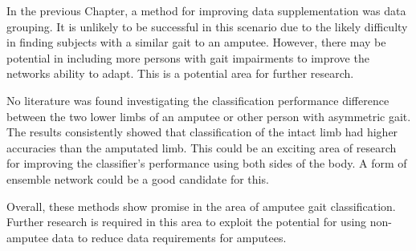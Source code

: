 In the previous Chapter, a method for improving data supplementation was data grouping. It is unlikely to be successful in this scenario due to the likely difficulty in finding subjects with a similar gait to an amputee. However, there may be potential in including more persons with gait impairments to improve the networks ability to adapt. This is a potential area for further research.

No literature was found investigating the classification performance difference between the two lower limbs of an amputee or other person with asymmetric gait. The results consistently showed that classification of the intact limb had higher accuracies than the amputated limb. This could be an exciting area of research for improving the classifier's performance using both sides of the body. A form of ensemble network could be a good candidate for this.

Overall, these methods show promise in the area of amputee gait classification. Further research is required in this area to exploit the potential for using non-amputee data to reduce data requirements for amputees.
